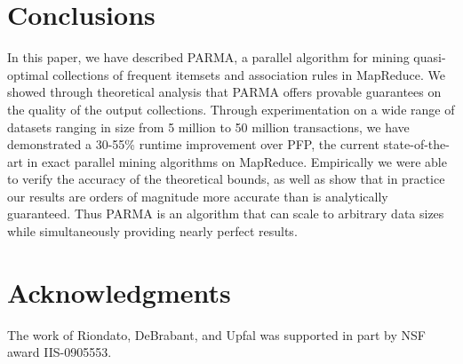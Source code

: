 \section{Conclusions}
\label{sec:conc}

In this paper, we have described PARMA, a parallel algorithm for mining
quasi-optimal collections of frequent itemsets and association rules in MapReduce.
We showed through theoretical analysis that PARMA offers provable guarantees on
the quality of the output collections. Through experimentation on a wide range
of datasets ranging in size from 5 million to 50 million transactions,
we have demonstrated a 30-55\% runtime improvement over PFP, the
current state-of-the-art in exact parallel mining algorithms on MapReduce.
Empirically we were able to verify the accuracy of the theoretical bounds, as
well as show that in practice our results are orders of magnitude more accurate
than is analytically guaranteed. Thus PARMA is an algorithm that can scale to
arbitrary data sizes while simultaneously providing nearly perfect results. 

\section{Acknowledgments}
\label{sec:ack}
The work of Riondato, DeBrabant, and Upfal was supported in part by NSF award IIS-0905553.
